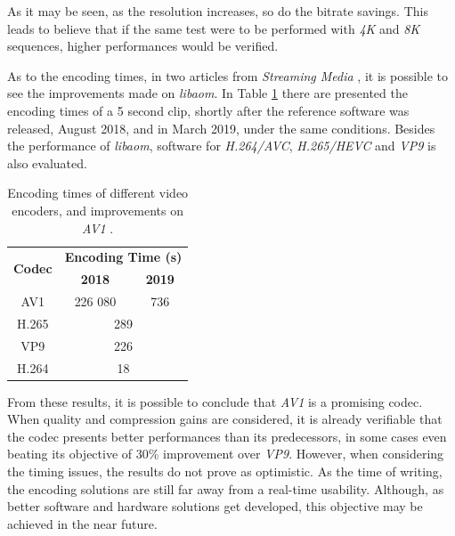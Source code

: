 As it may be seen, as the resolution increases, so do the bitrate savings. This leads to believe that if the same test were to be performed with \emph{4K} and \emph{8K} sequences, higher performances would be verified.

As to the encoding times, in two articles from \emph{Streaming Media} \cite{AV1FirstLook2018, GoodNewsAV12019}, it is possible to see the improvements made on \emph{libaom}. In Table \ref{tab:testtime} there are presented the encoding times of a 5 second clip, shortly after the reference software was released, August 2018, and in March 2019, under the same conditions. Besides the performance of \emph{libaom}, software for \emph{H.264/AVC}, \emph{H.265/HEVC} and \emph{VP9} is also evaluated.

\begin{table}[h]
    \centering
    \caption[Encoding times of different video encoders, and improvements on \emph{AV1}]{Encoding times of different video encoders, and improvements on \emph{AV1} \cite{AV1FirstLook2018, GoodNewsAV12019}.}
    \begin{tabular}{ccc} \toprule
        \multirow{2}{*}{\textbf{Codec}}     &      \multicolumn{2}{c}{\textbf{Encoding Time (s)}} \\
         &    \textbf{2018}  &   \textbf{2019}  \\ \toprule
        AV1            &    226 080        & 736 \\ \hline
        H.265          &    \multicolumn{2}{c}{289} \\ \hline
        VP9            &    \multicolumn{2}{c}{226} \\ \hline
        H.264          &    \multicolumn{2}{c}{18} \\
        \bottomrule
    \end{tabular}    
    \label{tab:testtime}
\end{table}

From these results, it is possible to conclude that \emph{AV1} is a promising codec. When quality and compression gains are considered, it is already verifiable that the codec presents better performances than its predecessors, in some cases even beating its objective of 30\% improvement over \emph{VP9}. However, when considering the timing issues, the results do not prove as optimistic. As the time of writing, the encoding solutions are still far away from a real-time usability. Although, as better software and hardware solutions get developed, this objective may be achieved in the near future.


\clearpage
\printbibliography[heading=subbibliography]

